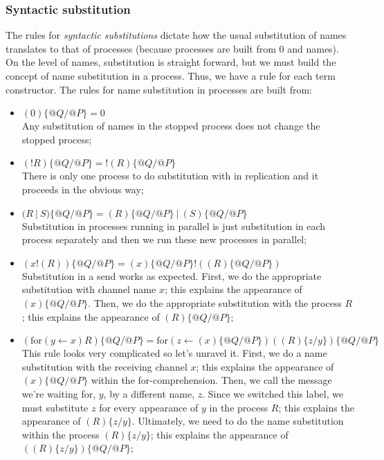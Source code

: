 \documentclass[12pt]{article}
\numberwithin{equation}{section}
\begin{document}
\subsubsection{Syntactic substitution} 
The rules for \emph{syntactic substitutions} dictate how the usual substitution of names translates to that of processes (because processes are built from 0 and names). On the level of names, substitution is straight forward, but we must build the concept of name substitution in a process. Thus, we have a rule for each term constructor. The rules for name substitution in processes are built from:
\begin{itemize}
\item $\displaystyle (0)\{ @Q / @P \}=0$ \\
Any substitution of names in the stopped process does not change the stopped process;

\item $\displaystyle (!R)\{ @Q / @P \}=!(R)\{ @Q / @P \}$ \\
There is only one process to do substitution with in replication and it proceeds in the obvious way;

\item $\displaystyle (R \ | \ S)\{ @Q / @P \}=(R)\{ @Q / @P \} \ | \ (S)\{ @Q / @P \}$ \\
Substitution in processes running in parallel is just substitution in each process separately and then we run these new processes in parallel;

\item $\displaystyle (x!(R))\{ @Q / @P \}= (x)\{ @Q / @P \}!((R)\{ @Q / @P \})$ \\
Substitution in a send works as expected. First, we do the appropriate substitution with channel name $x$; this explains the appearance of $(x)\{ @Q / @P \}$. Then, we do the appropriate substitution with the process $R$; this explains the appearance of $(R)\{ @Q / @P \}$;

\item $\displaystyle (\text{for}(y \leftarrow x)R)\{ @Q / @P \}= \text{for}(z \leftarrow (x)\{ @Q / @P \})((R)\{ z / y \})\{ @Q / @P \}$ \\
This rule looks very complicated so let's unravel it. First, we do a name substitution with the receiving channel $x$; this explains the appearance of $(x)\{ @Q / @P \}$ within the for-comprehension. Then, we call the message we're waiting for, $y$, by a different name, $z$. Since we switched this label, we must substitute $z$ for every appearance of $y$ in the process $R$; this explains the appearance of $(R)\{ z / y \}$. Ultimately, we need to do the name substitution within the process $(R)\{ z / y \}$; this explains the appearance of $((R)\{ z / y \})\{ @Q / @P \}$;


\end{itemize}
\end{document}
